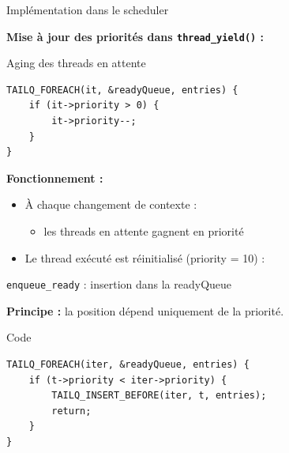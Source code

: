\begin{frame}[fragile]{Implémentation dans le scheduler}

\textbf{Mise à jour des priorités dans \texttt{thread\_yield()} :}

\vspace{0.3cm}

\begin{block}{Aging des threads en attente}
\small
\begin{verbatim}
TAILQ_FOREACH(it, &readyQueue, entries) {
    if (it->priority > 0) {
        it->priority--;
    }
}
\end{verbatim}
\end{block}

\vspace{0.5cm}

\textbf{Fonctionnement :}
\begin{itemize}
    \item À chaque changement de contexte :
    \begin{itemize}
        \item les threads en attente gagnent en priorité
    \end{itemize}

    \item Le thread exécuté est réinitialisé (priority = 10) :
\end{itemize}

\end{frame}

\begin{frame}[fragile]{\texttt{enqueue\_ready} : insertion dans la readyQueue}

\textbf{Principe :} la position dépend uniquement de la priorité.

\vspace{0.3cm}

\begin{block}{Code}
\small
\begin{verbatim}
TAILQ_FOREACH(iter, &readyQueue, entries) {
    if (t->priority < iter->priority) {
        TAILQ_INSERT_BEFORE(iter, t, entries);
        return;
    }
}
\end{verbatim}
\end{block}

\end{frame}